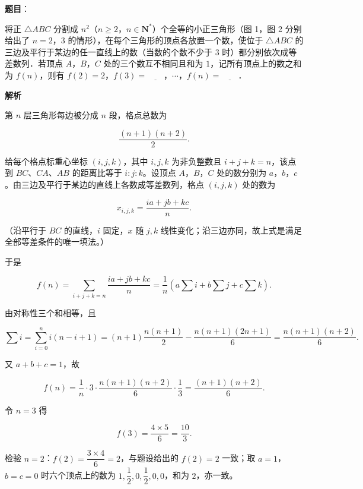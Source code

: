 \begin{answer}

\textbf{题目}：

将正 $\triangle ABC$ 分割成 $n^2$（$n\geqslant2$，$n\in\mathbf N^*$）个全等的小正三角形（图 1，图 2 分别给出了 $n=2$，$3$ 的情形），在每个三角形的顶点各放置一个数，使位于 $\triangle ABC$ 的三边及平行于某边的任一直线上的数（当数的个数不少于 $3$ 时）都分别依次成等差数列．若顶点 $A$，$B$，$C$ 处的三个数互不相同且和为 $1$，记所有顶点上的数之和为 $f(n)$，则有 $f(2)=2$，$f(3)=\underline{\qquad}$，$\cdots$，$f(n)=\underline{\qquad}$．
\nopagebreak[4]
\begin{center}\end{center}
\nopagebreak[4]
\textbf{解析}

第 $n$ 层三角形每边被分成 $n$ 段，格点总数为

\nopagebreak[4]
\[\frac{(n+1)(n+2)}2.\]

给每个格点标重心坐标 $(i,j,k)$，其中 $i,j,k$ 为非负整数且 $i+j+k=n$，该点到 $BC$、$CA$、$AB$ 的距离比等于 $i:j:k$。设顶点 $A$，$B$，$C$ 处的数分别为 $a$，$b$，$c$。由三边及平行于某边的直线上各数成等差数列，格点 $(i,j,k)$ 处的数为

\nopagebreak[4]
\[x_{i,j,k}=\frac{ia+jb+kc}{n}.\]

（沿平行于 $BC$ 的直线，$i$ 固定，$x$ 随 $j,k$ 线性变化；沿三边亦同，故上式是满足全部等差条件的唯一填法。）

于是

\nopagebreak[4]
\[f(n)=\sum_{i+j+k=n}\frac{ia+jb+kc}{n}
=\frac1n\left(a\sum i+b\sum j+c\sum k\right).\]

由对称性三个和相等，且

\nopagebreak[4]
\[\sum i=\sum_{i=0}^n i(n-i+1)=(n+1)\frac{n(n+1)}2-\frac{n(n+1)(2n+1)}6
=\frac{n(n+1)(n+2)}6.\]

又 $a+b+c=1$，故

\nopagebreak[4]
\[f(n)=\frac1n\cdot3\cdot\frac{n(n+1)(n+2)}6\cdot\frac13
=\frac{(n+1)(n+2)}6.\]

令 $n=3$ 得

\nopagebreak[4]
\[f(3)=\frac{4\times5}6=\frac{10}3.\]

检验 $n=2$：$f(2)=\dfrac{3\times4}6=2$，与题设给出的 $f(2)=2$ 一致；取 $a=1$，$b=c=0$ 时六个顶点上的数为 $1,\dfrac12,0,\dfrac12,0,0$，和为 $2$，亦一致。


\end{answer}
